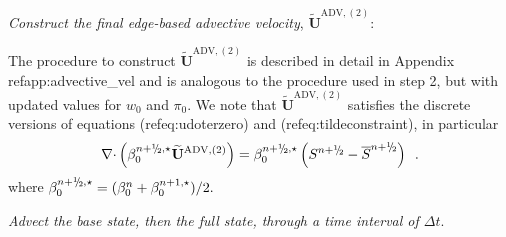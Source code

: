 \documentclass[11pt]{article}
\newcommand{\pizero}{\pi_0}
\newcommand{\nablab}{\mathbf{\nabla}}
\newcommand{\cdotb}{\mathbf{\cdot}}
\newcommand{\sfrac}[2]{\mathchoice
  {\kern0em\raise.5ex\hbox{\the\scriptfont0 #1}\kern-.15em/
   \kern-.15em\lower.25ex\hbox{\the\scriptfont0 #2}}
  {\kern0em\raise.5ex\hbox{\the\scriptfont0 #1}\kern-.15em/
   \kern-.15em\lower.25ex\hbox{\the\scriptfont0 #2}}
  {\kern0em\raise.5ex\hbox{\the\scriptscriptfont0 #1}\kern-.2em/
   \kern-.15em\lower.25ex\hbox{\the\scriptscriptfont0 #2}}
  {#1\!/#2}}
\newcommand{\myhalf}{\sfrac{1}{2}}
\newcommand{\nph}{{n + \myhalf}}
\newcommand{\uadvtwo}{\widetilde{\mathbf{U}}^{\mathrm{ADV},(2)}}
\newcommand{\dt}{\Delta t}
\begin{document}
 {\em Construct the final edge-based advective velocity}, $\uadvtwo$: 

The procedure to construct $\uadvtwo$ is described in detail in Appendix ref{app:advective\_vel}
and is analogous to the procedure used in step 2, but with updated values
for $w_0$ and $\pizero.$ We note that  $\uadvtwo$ satisfies the discrete versions of 
equations (ref{eq:udoterzero}) and (ref{eq:tildeconstraint}),
in particular
\begin{equation}
\nablab \cdotb \left(\beta_0^{\nph,\star} \uadvtwo\right) = \beta_0^{\nph,\star} 
\left(S^{\nph} - \overline{S}^{\nph}\right) \enskip .
\end{equation}
where $ \beta_0^{\nph,\star} = ( \beta_0^n +  \beta_0^{n+1,\star}) / 2.$

 {\em Advect the base state, then the full state, through a time interval of $\dt.$}
\end{document}
